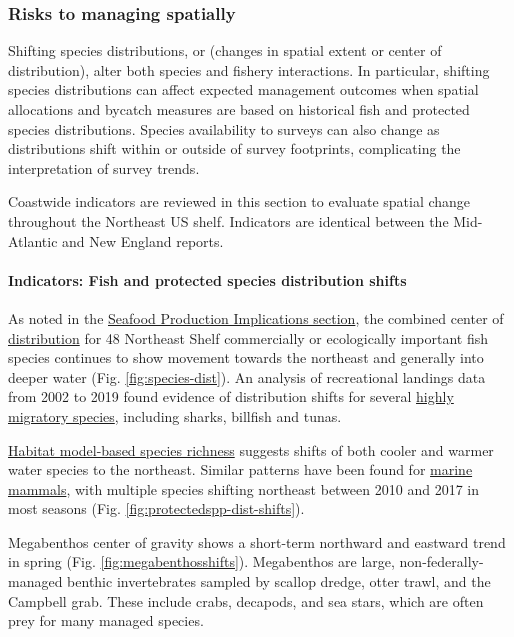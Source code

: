 \documentclass[
  10pt,
]{article}
\begin{document}
\subsubsection{Risks to managing spatially}\label{risks-to-managing-spatially}

Shifting species distributions, or (changes in spatial extent or center of distribution), alter both species and fishery interactions. In particular, shifting species distributions can affect expected management outcomes when spatial allocations and bycatch measures are based on historical fish and protected species distributions. Species availability to surveys can also change as distributions shift within or outside of survey footprints, complicating the interpretation of survey trends.

Coastwide indicators are reviewed in this section to evaluate spatial change throughout the Northeast US shelf. Indicators are identical between the Mid-Atlantic and New England reports.

\paragraph{Indicators: Fish and protected species distribution shifts}\label{indicators-fish-and-protected-species-distribution-shifts}

As noted in the \hyperref[implications]{Seafood Production Implications section}, the combined center of \href{https://noaa-edab.github.io/catalog/species_dist.html}{distribution} for 48 Northeast Shelf commercially or ecologically important fish species continues to show movement towards the northeast and generally into deeper water (Fig. \ref{fig:species-dist}). An analysis of recreational landings data from 2002 to 2019 found evidence of distribution shifts for several \href{https://noaa-edab.github.io/catalog/species_dist.html}{highly migratory species}, including sharks, billfish and tunas.

\href{https://noaa-edab.github.io/catalog/habitat_diversity.html}{Habitat model-based species richness} suggests shifts of both cooler and warmer water species to the northeast. Similar patterns have been found for \href{https://noaa-edab.github.io/catalog/cetacean_dist.html}{marine mammals}, with multiple species shifting northeast between 2010 and 2017 in most seasons (Fig. \ref{fig:protectedspp-dist-shifts}).

Megabenthos center of gravity shows a short-term northward and eastward trend in spring (Fig. \ref{fig:megabenthosshifts}). Megabenthos are large, non-federally-managed benthic invertebrates sampled by scallop dredge, otter trawl, and the Campbell grab. These include crabs, decapods, and sea stars, which are often prey for many managed species.
\end{document}
